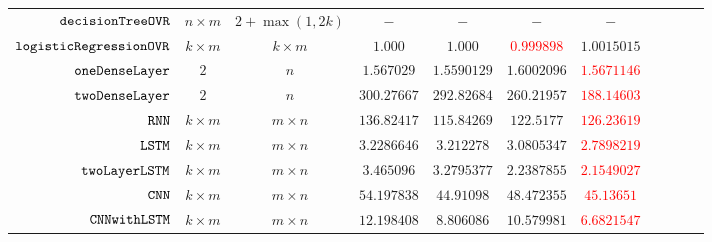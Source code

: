 {\begin {table}[H]
\begin{center}
{\begin{tabular}{| >{\tiny}r | c | c | c | c | c | c | c | c | c | c  }
         $  \mathtt{decisionTreeOVR}$ & $n\times m$ &  $2+\max(1,2k)  $ &  $ -  $  &  $-$ & $-$ & $-$ \\
         $  \mathtt{logisticRegressionOVR}$    & $k \times m$ &  $ k \times m $ &  $ 1.000  $  &  $ 1.000 $ & \textcolor{red}{$ 0.999898$} & $ 1.0015015 $ \\
         $  \mathtt{oneDenseLayer}$ & $2$   & $ n $   &  $ 1.567029  $  &  {$ 1.5590129 $} & $1.6002096$ & \textcolor{red}{$ 1.5671146 $}  \\
         {$ \mathtt{twoDenseLayer}$} & $2$ &  $ n $ &  $ 300.27667 $  &  $ 292.82684 $ & $ 260.21957 $ & \textcolor{red}{$ 188.14603 $}  \\
         $  \mathtt{RNN}$           & $ k \times m  $  & $ m \times n $ &  $ 136.82417 $  &  $ 115.84269 $ & $ 122.5177 $ & \textcolor{red}{$ 126.23619 $}  \\
         $  \mathtt{LSTM}$          & $ k \times m $   &  $ m \times n $  &  $ 3.2286646  $  &  $ 3.212278 $ & $3.0805347$ & \textcolor{red}{${2.7898219}$}  \\
         $  \mathtt{twoLayerLSTM}$  & $ k \times m $ &  $ m \times n $  &  $ 3.465096  $  &  $3.2795377$ & {${2.2387855}$} & \textcolor{red}{$2.1549027$}  \\
         $ \mathtt{CNN}$ & $ k \times m $ &  $  m \times n $ &  $54.197838$  &  $44.91098$ & $48.472355$ & \textcolor{red}{$45.13651$}  \\
         $ \mathtt{CNNwithLSTM}$ & $ k \times m $ &  $ m \times n $ &  $ 12.198408  $  &  $  8.806086$ & $ 10.579981 $ & \textcolor{red}{$ 6.6821547 $} \\
         \hline \hline
        \end{tabular}
}
\end{center}
\end{table}
}


